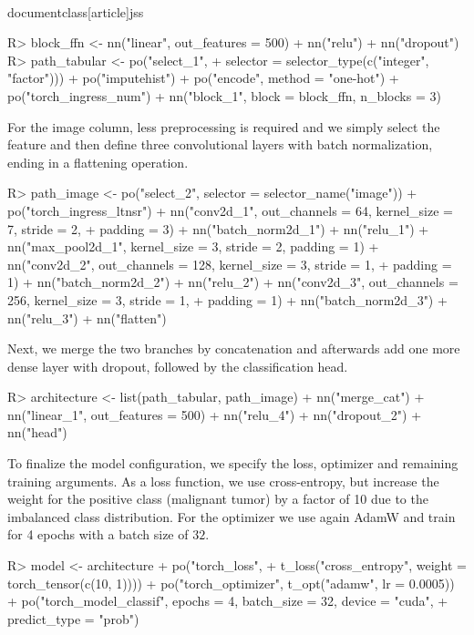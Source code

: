 \\documentclass[article]{jss}
\theoremstyle{definition}
\begin{document}
\begin{CodeInput}
R> block_ffn <- nn("linear", out_features = 500) %
+    nn("relu") %
+    nn("dropout")
R> path_tabular <- po("select_1",
+      selector = selector_type(c("integer", "factor"))) %
+    po("imputehist") %
+    po("encode", method = "one-hot") %
+    po("torch_ingress_num") %
+    nn("block_1", block = block_ffn, n_blocks = 3)
\end{CodeInput}

For the image column, less preprocessing is required and we simply select the feature and then define three convolutional layers with batch normalization, ending in a flattening operation.

\begin{CodeInput}
R> path_image <- po("select_2", selector = selector_name("image")) %
+    po("torch_ingress_ltnsr") %
+    nn("conv2d_1", out_channels = 64, kernel_size = 7, stride = 2,
+      padding = 3) %
+    nn("batch_norm2d_1") %
+    nn("relu_1") %
+    nn("max_pool2d_1", kernel_size = 3, stride = 2, padding = 1) %
+    nn("conv2d_2", out_channels = 128, kernel_size = 3, stride = 1,
+      padding = 1) %
+    nn("batch_norm2d_2") %
+    nn("relu_2") %
+    nn("conv2d_3", out_channels = 256, kernel_size = 3, stride = 1,
+      padding = 1) %
+    nn("batch_norm2d_3") %
+    nn("relu_3") %
+    nn("flatten")
\end{CodeInput}

Next, we merge the two branches by concatenation and afterwards add one more dense layer with dropout, followed by the classification head.

\begin{CodeInput}
R> architecture <- list(path_tabular, path_image) %
+    nn("merge_cat") %
+    nn("linear_1", out_features = 500) %
+    nn("relu_4") %
+    nn("dropout_2") %
+    nn("head")
\end{CodeInput}

To finalize the model configuration, we specify the loss, optimizer and remaining training arguments.
As a loss function, we use cross-entropy, but increase the weight for the positive class (malignant tumor) by a factor of 10 due to the imbalanced class distribution.
For the optimizer we use again AdamW and train for 4 epochs with a batch size of $32$.

\begin{CodeInput}
R> model <- architecture %
+    po("torch_loss",
+      t_loss("cross_entropy", weight = torch_tensor(c(10, 1)))) %
+    po("torch_optimizer", t_opt("adamw", lr = 0.0005)) %
+    po("torch_model_classif", epochs = 4, batch_size = 32, device = "cuda",
+      predict_type = "prob")
\end{CodeInput}
\end{document}
